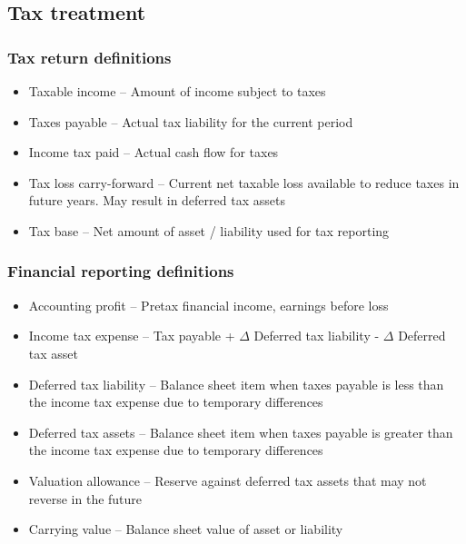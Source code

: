 \documentclass[../notes_compiled.tex]{subfiles}
\begin{document}
\subsection{Tax treatment}
\subsubsection{Tax return definitions}
\begin{itemize}
\item Taxable income -- Amount of income subject to taxes
\item Taxes payable -- Actual tax liability for the current period
\item Income tax paid -- Actual cash flow for taxes
\item Tax loss carry-forward -- Current net taxable loss available to reduce taxes in future years. May result in deferred tax assets
\item Tax base -- Net amount of asset / liability used for tax reporting
\end{itemize}
\subsubsection{Financial reporting definitions}
\begin{itemize}
\item Accounting profit -- Pretax financial income, earnings before loss
\item Income tax expense -- Tax payable + $\Delta$ Deferred tax liability - $\Delta$ Deferred tax asset
\item Deferred tax liability -- Balance sheet item when taxes payable is less than the income tax expense due to temporary differences
\item Deferred tax assets -- Balance sheet item when taxes payable is greater than the income tax expense due to temporary differences
\item Valuation allowance -- Reserve against deferred tax assets that may not reverse in the future
\item Carrying value -- Balance sheet value of asset or liability
\end{itemize}
\end{document}
